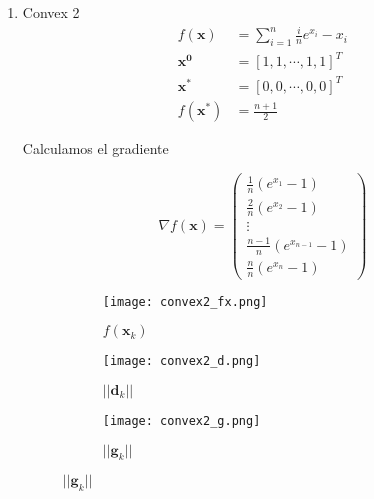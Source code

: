 \documentclass{article}
\begin{document}
\begin{enumerate}
\begin{enumerate}
\newpage
  \item Convex 2
  \begin{align*} 
  f(\boldsymbol{x}) &= \sum_{i = 1}^{n} \frac{i}{n}e^{x_i} - x_i\\
  \boldsymbol{x^0} &= [1, 1, \cdots, 1, 1]^T \\
  \boldsymbol{x^*} &= [0,0,\cdots, 0, 0]^T \\
  f(\boldsymbol{x^*}) &= \frac{n+1}{2}
  \end{align*}

  Calculamos el gradiente

  $$\nabla f(\boldsymbol{x}) = 
   \begin{pmatrix}
     \frac{1}{n}(e^{x_1} - 1) \\
     \frac{2}{n}(e^{x_2} - 1)\\
     \vdots\\
     \frac{n-1}{n}(e^{x_{n-1}} - 1)\\
     \frac{n}{n}(e^{x_n} - 1)
   \end{pmatrix}$$


  \begin{figure}[ht]
    \centering
    \begin{subfigure}[b]{0.3\linewidth}
        \centering
        \texttt{[image: convex2\_fx.png]}
        \caption{$f(\boldsymbol{x}_k)$}
        \label{convex2_f}
    \end{subfigure}
    \begin{subfigure}[b]{0.3\linewidth}
        \centering
        \texttt{[image: convex2\_d.png]}
        \caption{$||\boldsymbol{d}_k||$}
        \label{convex2_d}
    \end{subfigure}
    \begin{subfigure}[b]{0.3\linewidth}
        \centering
        \texttt{[image: convex2\_g.png]}
        \caption{$||\boldsymbol{g}_k||$}
        \label{convex2_g}
    \end{subfigure}
  \end{figure}


\end{enumerate}

\end{enumerate}
\end{document}
